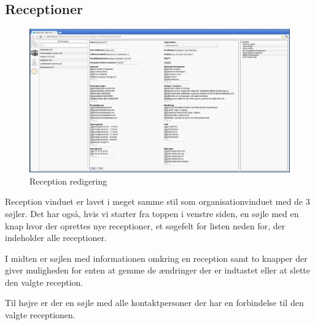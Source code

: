 \subsection{Receptioner}
\begin{figure}[ht!]
\centering
\includegraphics[width=\textwidth]{images/screen_rec.png}
\caption{Reception redigering}
\label{fig:screenrec}
\end{figure}
Reception vinduet er lavet i meget samme stil som organisationvinduet med de 3 søjler. Det har også, hvis vi starter fra toppen i venstre siden, en søjle med en knap hvor der oprettes nye receptioner, et søgefelt for listen neden for, der indeholder alle receptioner. 

I midten er søjlen med informationen omkring en reception samt to knapper der giver muligheden for enten at gemme de ændringer der er indtastet eller at slette den valgte reception. 

Til højre er der en søjle med alle kontaktpersoner der har en forbindelse til den valgte receptionen.

\pagebreak
